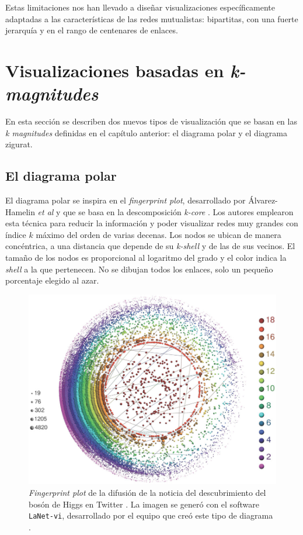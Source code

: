Estas limitaciones nos han llevado a diseñar visualizaciones específicamente adaptadas a las características de las redes mutualistas: bipartitas, con una fuerte jerarquía y en el rango de centenares de enlaces. 

\clearpage
\section{Visualizaciones basadas en \textit{k-magnitudes}}

En esta sección se describen dos nuevos tipos de visualización que se basan en las \textit{k magnitudes} definidas en el capítulo anterior: el diagrama polar y el diagrama zigurat.

\subsection{El diagrama polar}

El diagrama polar se inspira en el \textit{fingerprint plot}, desarrollado por Álvarez-Hamelin \textit{et al} y que se basa en la descomposición \textit{k-core} \cite{alvarez2005k}. Los autores emplearon esta técnica para reducir la información y poder visualizar redes muy grandes con índice $k$ máximo del orden de varias decenas. Los nodos se ubican de manera concéntrica, a una distancia que depende de su \textit{k-shell} y de las de sus vecinos. El tamaño de los nodos es proporcional al logaritmo del grado y el color indica la \textit{shell} a la que pertenecen. No se dibujan todos los enlaces, solo un pequeño porcentaje elegido al azar.

\begin{figure}[h!]
\centering
\includegraphics[scale=0.5]{Figures/VIS_fingerprint_plot.png}
\caption{\textit{Fingerprint plot} de la difusión de la noticia del descubrimiento del bosón de Higgs en Twitter \cite{de2013anatomy}. La imagen se generó con el software \texttt{LaNet-vi}, desarrollado por el equipo que creó este tipo de diagrama \cite{alvarez2008low}.}
\label{fig:VIS_M_PL_034_polar}
\end{figure}

